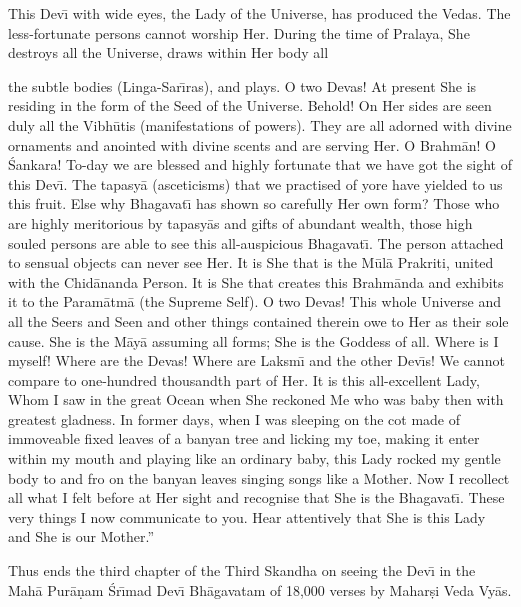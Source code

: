 This Dev\={\i} with wide eyes, the Lady of the Universe, has produced the Vedas. The less-fortunate persons cannot worship Her. During the time of Pralaya, She destroys all the Universe, draws within Her body all

the subtle bodies (Linga-Sar\={\i}ras), and plays. O two Devas! At present She is residing in the form of the Seed of the Universe. Behold! On Her sides are seen duly all the Vibh\=utis (manifestations of powers). They are all adorned with divine ornaments and anointed with divine scents and are serving Her. O Brahm\=an! O \'Sankara! To-day we are blessed and highly fortunate that we have got the sight of this Dev\={\i}. The tapasy\=a (asceticisms) that we practised of yore have yielded to us this fruit. Else why Bhagavat\={\i} has shown so carefully Her own form? Those who are highly meritorious by tapasy\=as and gifts of abundant wealth, those high souled persons are able to see this all-auspicious Bhagavat\={\i}. The person attached to sensual objects can never see Her. It is She that is the M\=ul\=a Prakriti, united with the Chid\=ananda Person. It is She that creates this Brahm\=anda and exhibits it to the Param\=atm\=a (the Supreme Self). O two Devas! This whole Universe and all the Seers and Seen and other things contained therein owe to Her as their sole cause. She is the M\=ay\=a assuming all forms; She is the Goddess of all. Where is I myself! Where are the Devas! Where are Laksm\={\i} and the other Dev\={\i}s! We cannot compare to one-hundred thousandth part of Her. It is this all-excellent Lady, Whom I saw in the great Ocean when She reckoned Me who was baby then with greatest gladness. In former days, when I was sleeping on the cot made of immoveable fixed leaves of a banyan tree and licking my toe, making it enter within my mouth and playing like an ordinary baby, this Lady rocked my gentle body to and fro on the banyan leaves singing songs like a Mother. Now I recollect all what I felt before at Her sight and recognise that She is the Bhagavat\={\i}. These very things I now communicate to you. Hear attentively that She is this Lady and She is our Mother.''

Thus ends the third chapter of the Third Skandha on seeing the Dev\={\i} in the Mah\=a Pur\=a\d{n}am \'Sr\={\i}mad Dev\={\i} Bh\=agavatam of 18,000 verses by Mahar\d{s}i Veda Vy\=as.



